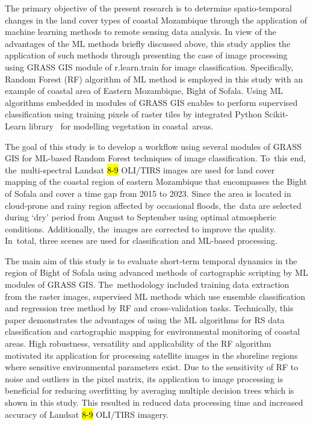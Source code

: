 \documentclass[coasts,article,accept,pdftex,oneauthor]{Definitions/mdpi}
\begin{document}
{The primary objective of the present research is to determine spatio-temporal changes in the land cover types of coastal Mozambique through the application of machine learning methods to remote sensing data analysis. }In view of the advantages of the ML methods briefly discussed above, {this study applies} the application of such methods {through presenting} the case of image processing using GRASS GIS module of r.learn.train for image classification. Specifically,{ }Random Forest (RF) algorithm of ML method{ is employed in this study }with an example of coastal area of Eastern Mozambique, Bight of Sofala. Using ML algorithms embedded in modules of GRASS GIS enables to perform supervised classification using training pixels of raster tiles by integrated Python Scikit-Learn library~\cite{Pedregosa} for modelling vegetation in coastal~areas. 

{The goal of this study is to develop a workflow using several modules of GRASS GIS for ML-based Random Forest techniques of image classification. To~this end, the~multi-spectral Landsat \hl{8-9} %
 OLI/TIRS images are used for land cover mapping of the coastal region of eastern Mozambique that encompasses the Bight of Sofala and cover a time gap from 2015 to 2023. Since the area is located in cloud-prone and rainy region affected by occasional floods, the~data are selected during `dry' period from August to September using optimal atmospheric conditions. Additionally, the~images are corrected to improve the quality. In~total, three scenes are used for classification and ML-based processing.}

{The main aim of this study is to evaluate short-term temporal dynamics in the region of Bight of Sofala using advanced methods of cartographic scripting by ML modules of GRASS GIS. The~methodology included training data extraction from the raster images, supervised ML methods which use ensemble classification and regression tree method by RF and cross-validation tasks. Technically, this paper demonstrates the advantages of using the ML algorithms for RS data classification and cartographic mapping for environmental monitoring of coastal areas}. {High robustness, versatility and applicability of the RF algorithm motivated its application for processing satellite images in the shoreline regions where sensitive environmental parameters exist. Due to the sensitivity of RF to noise and outliers in the pixel matrix, its application to image processing is beneficial for reducing overfitting by averaging multiple decision trees which is shown in this study. This resulted in reduced data processing time and increased accuracy of Landsat \hl{8-9} OLI/TIRS imagery}. 
\end{document}
